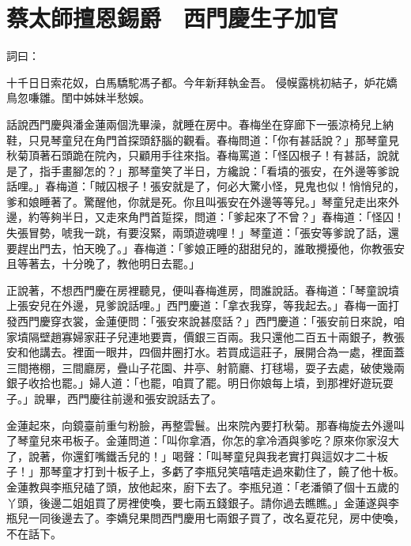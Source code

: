 %

\chapter{蔡太師擅恩錫爵　西門慶生子加官}

詞曰：

十千日日索花奴，白馬驕駝馮子都。今年新拜執金吾。
侵幙露桃初結子，妒花嬌鳥忽嗛雛。閨中姊妹半愁娛。

話說西門慶與潘金蓮兩個洗畢澡，就睡在房中。春梅坐在穿廊下一張涼椅兒上納鞋，只見琴童兒在角門首探頭舒腦的觀看。春梅問道：「你有甚話說？」那琴童見秋菊頂著石頭跪在院內，只顧用手往來指。春梅罵道：「怪囚根子！有甚話，說就是了，指手畫腳怎的？」那琴童笑了半日，方纔說：「看墳的張安，在外邊等爹說話哩。」春梅道：「賊囚根子！張安就是了，何必大驚小怪，見鬼也似！悄悄兒的，爹和娘睡著了。驚醒他，你就是死。你且叫張安在外邊等等兒。」琴童兒走出來外邊，約等夠半日，又走來角門首踅探，問道：「爹起來了不曾？」春梅道：「怪囚！失張冒勢，唬我一跳，有要沒緊，兩頭遊魂哩！」琴童道：「張安等爹說了話，還要趕出門去，怕天晚了。」春梅道：「爹娘正睡的甜甜兒的，誰敢攪擾他，你教張安且等著去，十分晚了，教他明日去罷。」

正說著，不想西門慶在房裡聽見，便叫春梅進房，問誰說話。春梅道：「琴童說墳上張安兒在外邊，見爹說話哩。」西門慶道：「拿衣我穿，等我起去。」春梅一面打發西門慶穿衣裳，金蓮便問：「張安來說甚麼話？」西門慶道：「張安前日來說，咱家墳隔壁趙寡婦家莊子兒連地要賣，價銀三百兩。我只還他二百五十兩銀子，教張安和他講去。裡面一眼井，四個井圈打水。若買成這莊子，展開合為一處，裡面蓋三間捲棚，三間廳房，疊山子花園、井亭、射箭廳、打毬場，耍子去處，破使幾兩銀子收拾也罷。」婦人道：「也罷，咱買了罷。明日你娘每上墳，到那裡好遊玩耍子。」說畢，西門慶往前邊和張安說話去了。

金蓮起來，向鏡臺前重勻粉臉，再整雲鬟。出來院內要打秋菊。那春梅旋去外邊叫了琴童兒來弔板子。金蓮問道：「叫你拿酒，你怎的拿冷酒與爹吃？原來你家沒大了，說著，你還釘嘴鐵舌兒的！」喝聲：「叫琴童兒與我老實打與這奴才二十板子！」那琴童才打到十板子上，多虧了李瓶兒笑嘻嘻走過來勸住了，饒了他十板。金蓮教與李瓶兒磕了頭，放他起來，廚下去了。李瓶兒道：「老潘領了個十五歲的丫頭，後邊二姐姐買了房裡使喚，要七兩五錢銀子。請你過去瞧瞧。」金蓮遂與李瓶兒一同後邊去了。李嬌兒果問西門慶用七兩銀子買了，改名夏花兒，房中使喚，不在話下。

